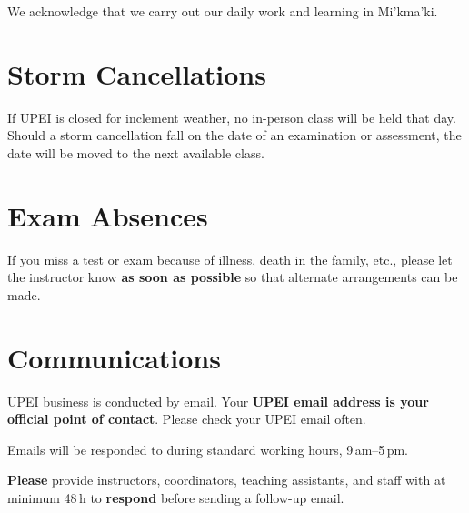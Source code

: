 We acknowledge that we carry out our daily work and learning in Mi'kma'ki.

\section{Storm Cancellations}

If UPEI is closed for inclement weather, no in-person class will be held that day. Should a storm cancellation fall on the date of an examination or assessment, the date will be moved to the next available class.

\section{Exam Absences}

If you miss a test or exam because of illness, death in the family, etc., please let the instructor know \textbf{as soon as possible} so that alternate arrangements can be made.

\section{Communications}

UPEI business is conducted by email. Your \textbf{UPEI email address is your official point of contact}. Please check your UPEI email often.

Emails will be responded to during standard working hours, 9\,am--5\,pm.

\textbf{Please} provide instructors, coordinators, teaching assistants, and staff with at minimum 48\,h to \textbf{respond} before sending a follow-up email.

